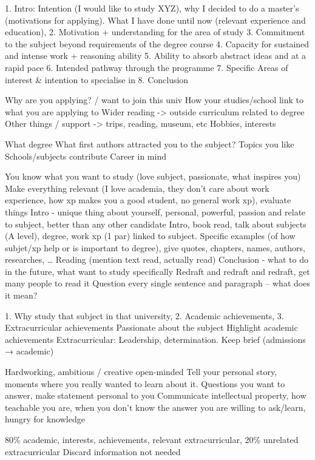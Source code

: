 \documentclass[11pt]{article}
\newcommand*{\NEWLINE}{\vspace{0.75em}}
\begin{document}
1. Intro: Intention (I would like to study XYZ), why I decided to do a master’s (motivations for applying). What I have done until now (relevant experience and education), 
2. Motivation + understanding for the area of study
3. Commitment to the subject beyond requirements of the degree course
4. Capacity for sustained and intense work + reasoning ability
5. Ability to absorb abstract ideas and at a rapid pace
6. Intended pathway through the programme
7. Specific Areas of interest \& intention to specialise in
8. Conclusion
\NEWLINE{}


Why are you applying? / want to join this univ
How your studies/school link to what you are applying to
Wider reading -> outside curriculum related to degree
Other things / support -> trips, reading, museum, etc
Hobbies, interests \NEWLINE{}

What degree
What first authors attracted you to the subject?
Topics you like
Schools/subjects contribute
Career in mind \NEWLINE{}

You know what you want to study (love subject, passionate, what inspires you) 
Make everything relevant (I love academia, they don’t care about work experience, how xp makes you a good student, no general work xp), evaluate things
Intro - unique thing about yourself, personal, powerful, passion and relate to subject, better than any other candidate
Intro, book read, talk about subjects (A level), degree, work xp (1 par) linked to subject.
Specific examples (of how subjet/xp help or is important to degree), give quotes, chapters, names, authors, researches, … 
Reading (mention text read, actually read)
Conclusion - what to do in the future, what want to study specifically
Redraft and redraft and redraft, get many people to read it
Question every single sentence and paragraph -- what does it mean?
\NEWLINE{}

1. Why study that subject in that university, 2. Academic achievements, 3. Extracurricular achievements
Passionate about the subject
Highlight academic achievements
Extracurricular: Leadership, determination. Keep brief (admissions → academic)
\NEWLINE{}

Hardworking, ambitious / creative open-minded
Tell your personal story, moments where you really wanted to learn about it. Questions you want to answer, make statement personal to you
Communicate intellectual property, how teachable you are, when you don’t know the answer you are willing to ask/learn, hungry for knowledge
\NEWLINE{}

80\% academic, interests, achievements, relevant extracurricular, 20\% unrelated extracurricular
Discard information not needed
\NEWLINE{}
\end{document}
